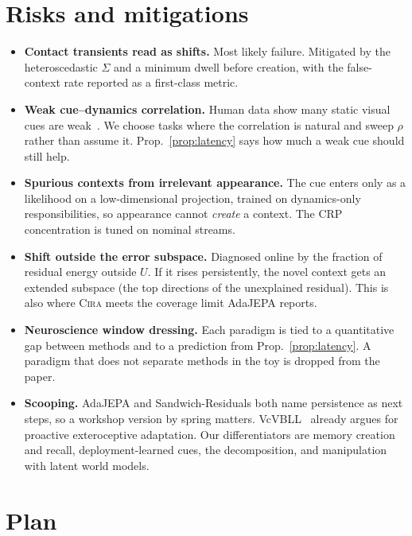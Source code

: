 \documentclass[10pt]{article}
\newcommand{\method}{\textsc{Cira}}
\begin{document}
\section{Risks and mitigations}\label{sec:risks}

\begin{itemize}
  \item \textbf{Contact transients read as shifts.} Most likely failure. Mitigated by the
  heteroscedastic $\Sigma$ and a minimum dwell before creation, with the false-context rate reported
  as a first-class metric.
  \item \textbf{Weak cue--dynamics correlation.} Human data show many static visual cues are
  weak~\cite{howard2013contextual}. We choose tasks where the correlation is natural and sweep $\rho$
  rather than assume it. Prop.~\ref{prop:latency} says how much a weak cue should still help.
  \item \textbf{Spurious contexts from irrelevant appearance.} The cue enters only as a likelihood on a
  low-dimensional projection, trained on dynamics-only responsibilities, so appearance cannot
  \emph{create} a context. The CRP concentration is tuned on nominal streams.
  \item \textbf{Shift outside the error subspace.} Diagnosed online by the fraction of residual energy
  outside $U$. If it rises persistently, the novel context gets an extended subspace (the top
  directions of the unexplained residual). This is also where \method{} meets the coverage limit
  AdaJEPA reports.
  \item \textbf{Neuroscience window dressing.} Each paradigm is tied to a quantitative gap between
  methods and to a prediction from Prop.~\ref{prop:latency}. A paradigm that does not separate methods
  in the toy is dropped from the paper.
  \item \textbf{Scooping.} AdaJEPA and Sandwich-Residuals both name persistence as next steps, so a
  workshop version by spring matters. VcVBLL~\cite{brunzema2026vcvbll} already argues for proactive
  exteroceptive adaptation. Our differentiators are memory creation and recall, deployment-learned
  cues, the decomposition, and manipulation with latent world models.
\end{itemize}

\section{Plan}
\end{document}
